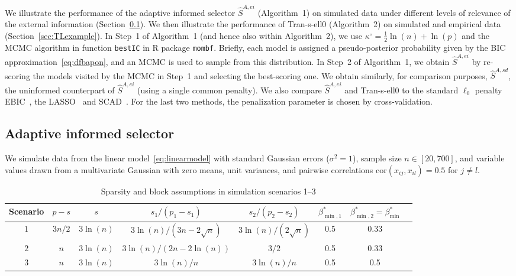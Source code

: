 \documentclass[
  12pt]{article}
\begin{document}
We illustrate the performance of the adaptive informed selector $\hat{S}^{A,ei}$ (Algorithm~1) on simulated data under different levels of relevance of the external information (Section~\ref{sec:simulationsss}).
We then illustrate the performance of Tran-s-ell0 (Algorithm~2) on simulated and empirical data (Section~\ref{sec:TLexample}).
In Step~1 of Algorithm~1 (and hence also within Algorithm~2), we use $\kappa^{\circ}=\tfrac12\ln(n)+\ln(p)$ and
the MCMC algorithm in function \texttt{bestIC} in R package \texttt{mombf}. Briefly, each model is assigned a
pseudo-posterior probability given by the BIC approximation~\eqref{eq:dfbapon}, and an MCMC is used to sample from this distribution. 
In Step~2 of Algorithm~1, we obtain $\hat S^{A,ei}$ by re-scoring the models visited by the MCMC in Step~1 and selecting the best-scoring one. We obtain similarly, for comparison purposes, $\hat S^{A,sd}$, the uninformed counterpart of $\hat{S}^{A,ei}$ (using a single common penalty). We also compare $\hat S^{A,ei}$ and Tran-s-ell0 to the standard $\ell_0$ penalty EBIC~\citep{EBIC}, the LASSO~\citep{lasso} and SCAD~\citep{Fan01SCAD}. For the last two methods, the penalization parameter is chosen by cross-validation. %


\subsection{Adaptive informed selector}\label{sec:simulationsss}

We simulate data from the linear model~\eqref{eq:linearmodel} with standard Gaussian errors ($\sigma^2=1$), sample size $n \in [20,700]$, and variable values drawn from a multivariate Gaussian with zero means, unit variances, and pairwise correlations $\mbox{cor}(x_{ij}, x_{il})= 0.5$ for $j \neq l$.

\begin{table}[ht]
\caption{Sparsity and block assumptions in simulation scenarios 1--3}
\label{tab:examples_bis}
\begin{center}
\begin{tabular}[]{@{}cccccccc@{}}
\hline
Scenario & $p-s$ & $s$ & $s_1/(p_1-s_1)$ &$s_2/(p_2-s_2)$ & $\beta_{\min,1}^*$ & $\beta_{\min,2}^*=\beta_{\min}^*$ \\
\hline
$1$    & $3n/2$ & $3\ln(n)$ & $3\ln(n)/(3n-2\sqrt{n})$ & $3\ln(n)/(2\sqrt{n})$  & 0.5 & 0.33\\
$2$    & $n$ & $3\ln(n)$ & $3\ln(n)/(2n-2\ln(n))$ & $3/2$   & 0.5 & 0.33 \\
$3$    & $n$ & $3\ln(n)$ & $3\ln(n)/n$ & $3\ln(n)/n$  & 0.5 & 0.5\\
\hline
\end{tabular}
\end{center}
\end{table}
\end{document}
